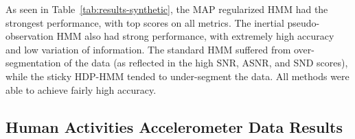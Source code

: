 \documentclass[letterpaper]{article}
\begin{document}
As seen in Table~\ref{tab:results-synthetic}, the MAP regularized HMM had the
strongest performance, with top scores on all metrics. The inertial
pseudo-observation HMM also had strong performance, with extremely high accuracy
and low variation of information. The standard HMM suffered from
over-segmentation of the data (as reflected in the high SNR, ASNR, and SND
scores), while the sticky HDP-HMM tended to under-segment the data. All methods
were able to achieve fairly high accuracy.

\subsection{Human Activities Accelerometer Data Results}\label{sec:quantitative}

\begin{table}[htbp]
\setlength{\abovecaptionskip}{0pt}
\setlength{\belowcaptionskip}{0cm}
\caption{Results from real 45D human accelerometer data.}
\label{tab:results-main}
\end{table}
\end{document}
